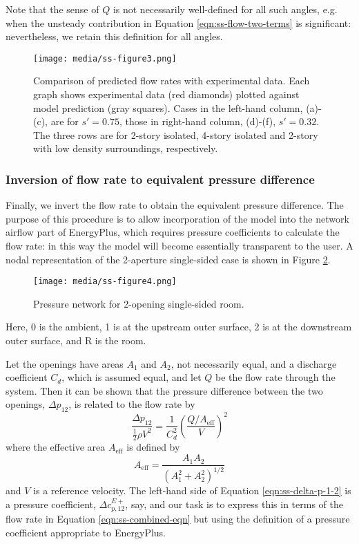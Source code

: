 Note that the sense of $Q$ is not necessarily well-defined for all such angles, e.g.
when the unsteady contribution in Equation \ref{eqn:ss-flow-two-terms} is significant:
nevertheless, we retain this definition for all angles.

\begin{figure}[hbtp] %
\centering
\texttt{[image: media/ss-figure3.png]}
\caption{Comparison of predicted flow rates with experimental data. Each graph shows experimental data (red diamonds) plotted against model prediction (gray squares). Cases in the left-hand column, (a)-(c), are for $s'=0.75$, those in right-hand column, (d)-(f), $s'=0.32$. The three rows are for 2-story isolated, 4-story isolated and 2-story with low density surroundings, respectively. \protect \label{fig:ss-figure-3-in-original}}
\end{figure}

\subsubsection{Inversion of flow rate to equivalent pressure difference}
Finally, we invert the flow rate to obtain the equivalent pressure difference. The purpose of this procedure is to allow incorporation of the model into the network airflow part of EnergyPlus, which requires pressure coefficients to calculate the flow rate: in this way the model will become essentially transparent to the user.
A nodal representation of the 2-aperture single-sided case is shown in Figure \ref{fig:ss-pressure-network-two-openings}.

\begin{figure}[hbtp] %
\centering
\texttt{[image: media/ss-figure4.png]}
\caption{Pressure network for 2-opening single-sided room. \protect \label{fig:ss-pressure-network-two-openings}}
\end{figure}

Here, 0 is the  ambient, 1 is at the upstream outer surface, 2 is at the downstream outer surface, and R is the room.

Let the openings have areas $A_1$ and $A_2$, not necessarily equal, and a discharge coefficient $C_d$, which is assumed equal, and let $Q$ be the flow rate through the system. Then it can be shown that the pressure difference between the two openings, $\Delta p_{12}$, is related to the flow rate by
\begin{equation}\label{eqn:ss-delta-p-1-2}
\frac{\Delta p_{12}}{\frac{1}{2}\rho V^2} = \frac{1}{C_d^2}\left(\frac{Q/A_\text{eff}}{V}\right)^2
\end{equation}
where the effective area $A_\text{eff}$ is defined by
\begin{equation}
A_\text{eff}=\frac{A_1 A_2}{\left(A_1^2+A_2^2\right)^{1/2}}
\end{equation}
and $V$ is a reference velocity. The left-hand side of Equation \ref{eqn:ss-delta-p-1-2} is a pressure coefficient, $\Delta c_{p,12}^{E+}$, say, and our task is to express this in terms of the flow rate in Equation \ref{eqn:ss-combined-eqn} but using the definition of a pressure coefficient appropriate to EnergyPlus.

